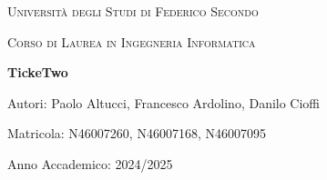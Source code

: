 \documentclass[openany]{book}
\begin{document}
\begin{titlepage}

    \centering
    {\scshape\LARGE Università degli Studi di Federico Secondo \par}
    \vspace{1cm}
    {\scshape\Large Corso di Laurea in Ingegneria Informatica \par}
    \vfill
    {\huge\bfseries TickeTwo \par}
    \vspace{2cm}
    {\Large Autori: Paolo Altucci, Francesco Ardolino, Danilo Cioffi \par}
    \vspace{0.5cm}
    {\Large Matricola: N46007260, N46007168, N46007095 \par}
    \vspace{0.5cm}
    {\Large Anno Accademico: 2024/2025 \par}
    \vfill


\tableofcontents
\newpage
\end{titlepage}








\end{document}
